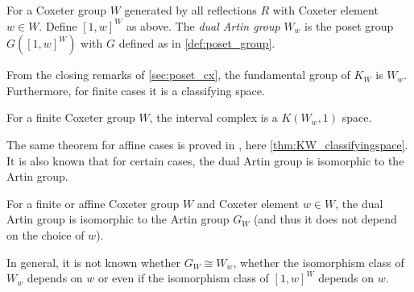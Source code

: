 \documentclass[class=article, crop=false]{standalone}
\begin{document}
\begin{definition}
    For a Coxeter group $W$ generated by all reflections $R$ with Coxeter element $w \in W$. Define $[1,w]^W$ as above. The \emph{dual Artin group} $W_w$ is the poset group $G([1,w]^W)$ with $G$ defined as in \cref{def:poset_group}.
\end{definition}

From the closing remarks of \cref{sec:poset_cx}, the fundamental group of $K_{W}$ is $W_w$. Furthermore, for finite cases it is a classifying space.

\begin{theorem}
    For a finite Coxeter group $W$, the interval complex is a $K(W_w,1)$ space.
    \label{thm:interval_cx_k_pi_1_finite}
\end{theorem}

The same theorem for affine cases is proved in \cite{paolini_salvetti_kpi1_2021}, here \cref{thm:KW_classifyingspace}. It is also known that for certain cases, the dual Artin group is isomorphic to the Artin group.

\begin{theorem}
    For a finite \cite{bessis_dual_2003} or affine \cite{mccammond_sulway_artin_2017} Coxeter group $W$ and Coxeter element $w \in W$, the dual Artin group is isomorphic to the Artin group $G_W$ (and thus it does not depend on the choice of $w$).
    \label{thm:dual_artin_iso_artin}
\end{theorem}

In general, it is not known whether $G_W \cong W_w$, whether the isomorphism class of $W_w$ depends on $w$ or even if the isomorphism class of $[1,w]^W$ depends on $w$.
\end{document}
